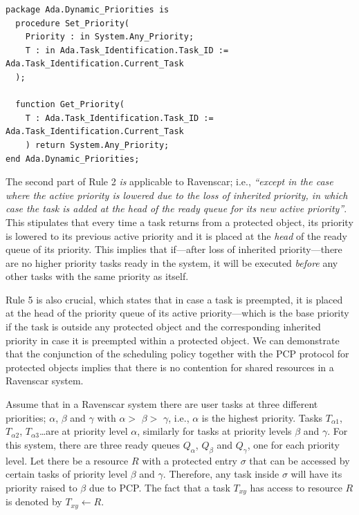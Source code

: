 \begin{minipage}{\listingwidth}
\begin{lstlisting}[label=ada_dynamic_priorities, caption=The
    \texttt{Ada.Dynamic\_Priorities} package specification]
package Ada.Dynamic_Priorities is
  procedure Set_Priority(
    Priority : in System.Any_Priority;
    T : in Ada.Task_Identification.Task_ID := Ada.Task_Identification.Current_Task
  );
  
  function Get_Priority(
    T : Ada.Task_Identification.Task_ID := Ada.Task_Identification.Current_Task
    ) return System.Any_Priority;
end Ada.Dynamic_Priorities;
\end{lstlisting}
\end{minipage}

The second part of Rule 2 \emph{is} applicable to Ravenscar; i.e.,
\emph{``except in the case where the active priority is lowered due to
  the loss of inherited priority, in which case the task is added at
  the head of the ready queue for its new active priority''}. This
stipulates that every time a task returns from a protected object, its
priority is lowered to its previous active priority and it is placed
at the \emph{head} of the ready queue of its priority. This implies
that if---after loss of inherited priority---there are no higher
priority tasks ready in the system, it will be executed \emph{before}
any other tasks with the same priority as itself.

Rule 5 is also crucial, which states that in case a task is preempted,
it is placed at the head of the priority queue of its active
priority---which is the base priority if the task is outside any
protected object and the corresponding inherited priority in case it
is preempted within a protected object. We can demonstrate that the
conjunction of the scheduling policy together with the PCP protocol
for protected objects implies that there is no contention for shared
resources in a Ravenscar system.

\newcommand\al{$\alpha$\xspace}
\newcommand\be{$\beta$\xspace}
\newcommand\ga{$\gamma$\xspace}
\newcommand\si{$\sigma$\xspace}

Assume that in a Ravenscar system there are user tasks at three
different priorities; \al, \be and $\gamma$ with \al $>$ \be $>$ \ga,
i.e., \al is the highest priority. Tasks $T_{\alpha 1}$, $T_{\alpha
  2}$, $T_{\alpha 3}$\ldots are at priority level \al, similarly for
tasks at priority levels \be and \ga. For this system, there are three
ready queues $Q_\alpha$, $Q_\beta$ and $Q_\gamma$, one for each
priority level. Let there be a resource $R$ with a protected entry \si
that can be accessed by certain tasks of priority level \be and
\ga. Therefore, any task inside \si will have its priority raised to
\be due to PCP. The fact that a task $T_{xy}$ has access to resource
$R$ is denoted by $T_{xy} \gets R$.

